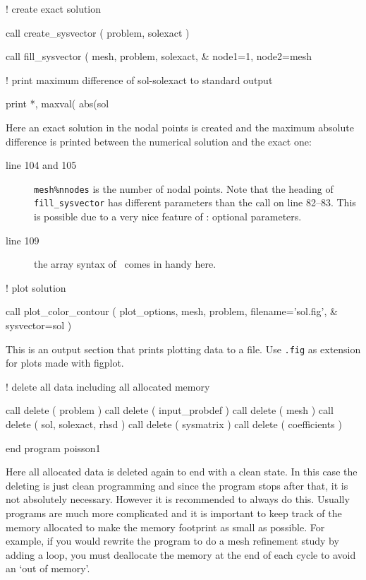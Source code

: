 \begin{listingcont}
! create exact solution

  call create_sysvector ( problem, solexact )

  call fill_sysvector ( mesh, problem, solexact, &
    node1=1, node2=mesh%

! print maximum difference of sol-solexact to standard output

  print *, maxval( abs(sol%
                                                                                
\end{listingcont}
Here an exact solution in the nodal points is created and the maximum
absolute difference is printed between the numerical solution and the exact
one:
\begin{description}
   \item[line 104 and 105] \texttt{mesh\%nnodes} is the number of nodal points.
Note that the heading of \texttt{fill\_sysvector} has different parameters than
the call on line 82--83. This is possible due to a very nice feature of \ftn:
 optional parameters.
   \item[line 109] the array syntax of \ftn\ comes in handy here.
\end{description}

\begin{listingcont}
! plot solution

  call plot_color_contour ( plot_options, mesh, problem, filename='sol.fig', &
    sysvector=sol ) 

\end{listingcont}
This is an output section that prints plotting data to a file. Use
\texttt{.fig} as extension for plots made with figplot.

\begin{listingcont}
! delete all data including all allocated memory
                                                                                
  call delete ( problem )
  call delete ( input_probdef )
  call delete ( mesh )
  call delete ( sol, solexact, rhsd )
  call delete ( sysmatrix )
  call delete ( coefficients )

end program poisson1
\end{listingcont}
Here all allocated data is deleted again to end with a clean state.
In this case the deleting is just
clean programming and since the program stops after that, it is not absolutely
necessary. However it is recommended to always do this.
Usually programs are much more complicated
and it is important to keep track of the memory allocated to make the memory
footprint as small as possible. For example, if you would rewrite the program
to do a mesh refinement study by adding a loop, you must deallocate the memory
at the end of each cycle to avoid an `out of memory'.

